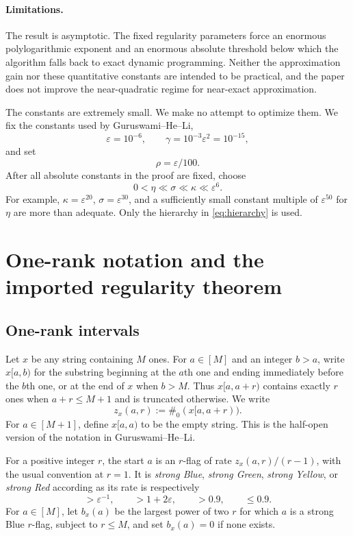 \documentclass[11pt]{article}
\theoremstyle{remark}
\newcommand{\zeros}{\#_0}
\newcommand{\eps}{\varepsilon}
\begin{document}
\paragraph{Limitations.}
The result is asymptotic.  The fixed regularity parameters force an enormous
polylogarithmic exponent and an enormous absolute threshold below which the
algorithm falls back to exact dynamic programming.  Neither the approximation
gain nor these quantitative constants are intended to be practical, and the
paper does not improve the near-quadratic regime for near-exact
approximation.

The constants are extremely small.  We make no attempt to optimize them.  We
fix the constants used by Guruswami--He--Li,
\begin{equation}\label{eq:constants}
 \eps=10^{-6},\qquad \gamma=10^{-3}\eps^2=10^{-15},
\end{equation}
and set
\begin{equation}\label{eq:rho-kappa}
 \rho=\eps/100.
\end{equation}
After all absolute constants in the proof are fixed, choose
\begin{equation}\label{eq:hierarchy}
 0<\eta\ll \sigma\ll \kappa\ll \eps^{6}.
\end{equation}
For example, $\kappa=\eps^{20}$, $\sigma=\eps^{30}$, and a sufficiently
small constant multiple of $\eps^{50}$ for $\eta$ are more than adequate.
Only the hierarchy in \eqref{eq:hierarchy} is used.

\section{One-rank notation and the imported regularity theorem}
\label{sec:one-rank}

\subsection{One-rank intervals}

Let $x$ be any string containing $M$ ones.  For
$a\in[M]$ and an integer $b>a$, write $x[a,b)$ for the substring beginning
at the $a$th one and ending immediately before the $b$th one, or at the end
of $x$ when $b>M$.  Thus $x[a,a+r)$ contains exactly $r$ ones when
$a+r\le M+1$ and is truncated otherwise.  We write
\[
 z_x(a,r):=\zeros(x[a,a+r)).
\]
For $a\in[M+1]$, define $x[a,a)$ to be the empty string.
This is the half-open version of the notation in Guruswami--He--Li.

For a positive integer $r$, the start $a$ is an $r$-flag of rate
$z_x(a,r)/(r-1)$, with the usual convention at $r=1$.  It is
\emph{strong Blue}, \emph{strong Green}, \emph{strong Yellow}, or
\emph{strong Red} according as its rate is respectively
\[
 >\eps^{-1},\qquad >1+2\eps,\qquad >0.9,\qquad \le 0.9.
\]
For $a\in[M]$, let $b_x(a)$ be the largest power of two $r$ for which $a$ is
a strong Blue $r$-flag, subject to $r\le M$, and set $b_x(a)=0$ if none
exists.
\end{document}
